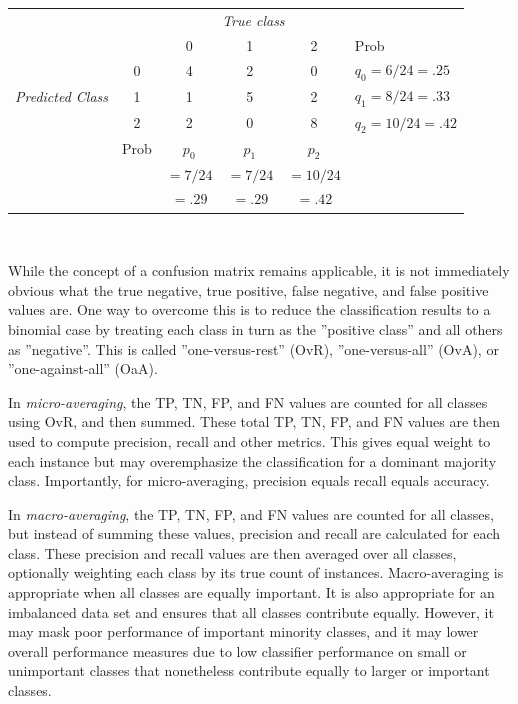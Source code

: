 \begin{center}
\vspace{\baselineskip}
\renewcommand{\arraystretch}{1.1}

\begin{tabular}{cc|ccc|l} \hline
     & & \multicolumn{3}{c|}{\emph{True class}} \\
                 &   & 0 & 1 & 2 & Prob \\ \hline
\multirow{3}{1.1cm}{\emph{Predicted Class}} & 0 & 4 & 2 & 0 & $q_0 = 6/24  = .25$ \\ 
                 & 1 & 1 & 5 & 2 & $q_1 = 8/24  = .33$ \\
                 & 2 & 2 & 0 & 8 & $q_2 = 10/24 = .42$ \\ \hline
     & Prob & $p_0$ & $p_1$ & $p_2$ &  \\
     &      & $=7/24$ & $=7/24$ & $=10/24$ &  \\ 
     &      & $=.29$ & $=.29$ & $=.42$ &  \\ \hline
\end{tabular} \\
\vspace{\baselineskip}
\end{center}

While the concept of a confusion matrix remains applicable, it is not immediately obvious what the true negative, true positive, false negative, and false positive values are.  One way to overcome this is to reduce the classification results to a binomial case by treating each class in turn as the ''positive class'' and all others as ''negative''. This is called ''one-versus-rest'' (OvR), ''one-versus-all'' (OvA), or ''one-against-all'' (OaA). 

In \emph{micro-averaging}, the TP, TN, FP, and FN values are counted for all classes using OvR, and then summed. These total TP, TN, FP, and FN values are then used to compute precision, recall and other metrics. This gives equal weight to each instance but may overemphasize the classification for a dominant majority class. Importantly, for micro-averaging, precision equals recall equals accuracy.

In \emph{macro-averaging}, the TP, TN, FP, and FN values are counted for all classes, but instead of summing these values, precision and recall are calculated for each class. These precision and recall values are then averaged over all classes, optionally weighting each class by its true count of instances. Macro-averaging is appropriate when all classes are equally important. It is also appropriate for an imbalanced data set and ensures that all classes contribute equally. However, it may mask poor performance of important minority classes, and it may lower overall performance measures due to low classifier performance on small or unimportant classes that nonetheless contribute equally to larger or important classes. 

